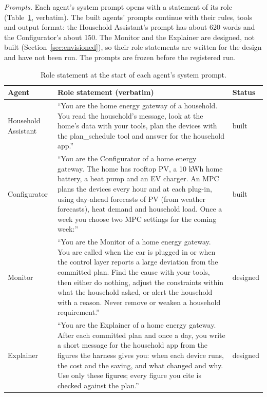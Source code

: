 \documentclass[12pt,a4paper]{report}
\begin{document}
\textit{Prompts.} Each agent's system prompt opens with a statement of
its role (Table~\ref{tab:prompts}, verbatim). The built agents' prompts
continue with their rules, tools and output format: the Household
Assistant's prompt has about 620 words and the Configurator's about
150. The Monitor and the Explainer are designed, not built
(Section~\ref{sec:envisioned}), so their role statements are written
for the design and have not been run. The prompts are frozen before the
registered run.

\begin{table}[htbp]
\caption{Role statement at the start of each agent's system prompt.}
\label{tab:prompts}
\small
\begin{tabularx}{\textwidth}{@{}>{\raggedright\arraybackslash}p{2.5cm}X>{\raggedright\arraybackslash}p{1.6cm}@{}}
\toprule
Agent & Role statement (verbatim) & Status \\
\midrule
Household Assistant & ``You are the home energy gateway of a household.
You read the household's message, look at the home's data with your
tools, plan the devices with the plan\_schedule tool and answer for the
household app.'' & built \\[4pt]
Configurator & ``You are the Configurator of a home energy gateway. The
home has rooftop PV, a 10 kWh home battery, a
heat pump and an EV charger. An MPC plans the devices every hour and
at each plug-in, using day-ahead forecasts of PV (from weather
forecasts), heat demand and household load. Once a week you choose two
MPC settings for the coming week:'' & built \\[4pt]
Monitor & ``You are the Monitor of a home energy gateway. You are called
when the car is plugged in or when the control layer reports a large
deviation from the committed plan. Find the cause with your tools, then
either do nothing, adjust the constraints within what the household
asked, or alert the household with a reason. Never remove or weaken a
household requirement.'' & designed \\[4pt]
Explainer & ``You are the Explainer of a home energy gateway. After each
committed plan and once a day, you write a short message for the
household app from the figures the harness gives you: when each device
runs, the cost and the saving, and what changed and why. Use only these
figures; every figure you cite is checked against the plan.'' &
designed \\
\bottomrule
\end{tabularx}
\end{table}
\end{document}
